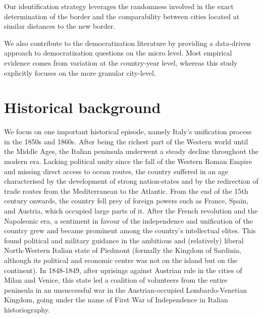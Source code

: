 Our identification strategy leverages the randomness involved in the exact determination of the border and the comparability between cities located at similar distances to the new border. 

We also contribute to the democratization literature by providing a data-driven approach to democratization questions on the micro level. Most empirical evidence comes from variation at the country-year level, whereas this study explicitly focuses on the more granular city-level. 

\section{Historical background}
We focus on one important historical episode, namely Italy’s unification process in the 1850s and 1860s. After being the richest part of the Western world until the Middle Ages, the Italian peninsula underwent a steady decline throughout the modern era. Lacking political unity since the fall of the Western Roman Empire and missing direct access to ocean routes, the country suffered in an age characterised by the development of strong nation-states and by the redirection of trade routes from the Mediterranean to the Atlantic. From the end of the 15th century onwards, the country fell prey of foreign powers such as France, Spain, and Austria, which occupied large parts of it. After the French revolution and the Napoleonic era, a sentiment in favour of the independence and unification of the country grew and became prominent among the country's intellectual elites. This found political and military guidance in the ambitious and (relatively) liberal North-Western Italian state of Piedmont (formally the Kingdom of Sardinia, although its political and economic centre was not on the island but on the continent). In 1848-1849, after uprisings against Austrian rule in the cities of Milan and Venice, this state led a coalition of volunteers from the entire peninsula in an unsuccessful war in the Austrian-occupied Lombardo-Venetian Kingdom, going under the name of First War of Independence in Italian historiography. 

